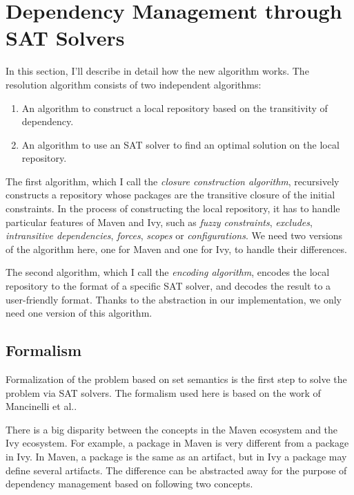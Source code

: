 \section{Dependency Management through SAT Solvers}

In this section, I'll describe in detail how the new algorithm works. The resolution algorithm consists of two independent algorithms:

\begin{enumerate}
\item An algorithm to construct a local repository based on the transitivity of dependency.
\item An algorithm to use an SAT solver to find an optimal solution on the local repository.
\end{enumerate}

The first algorithm, which I call the \emph{closure construction algorithm}, recursively constructs a repository whose packages are the transitive closure of the initial constraints. In the process of constructing the local repository, it has to handle particular features of Maven and Ivy, such as \emph{fuzzy constraints}, \emph{excludes}, \emph{intransitive dependencies}, \emph{forces}, \emph{scopes} or \emph{configurations}. We need two versions of the algorithm here, one for Maven and one for Ivy, to handle their differences.

The second algorithm, which I call the \emph{encoding algorithm}, encodes the local repository to the format of a specific SAT solver, and decodes the result to a user-friendly format. Thanks to the abstraction in our implementation, we only need one version of this algorithm.


\subsection{Formalism}

Formalization of the problem based on set semantics is the first step to solve the problem via SAT solvers. The formalism used here is based on the work of Mancinelli et al.\cite{mancinelli2006managing}.

There is a big disparity between the concepts in the Maven ecosystem and the Ivy ecosystem. For example, a package in Maven is very different from a package in Ivy. In Maven, a package is the same as an artifact, but in Ivy a package may define several artifacts. The difference can be abstracted away for the purpose of dependency management based on following two concepts.

